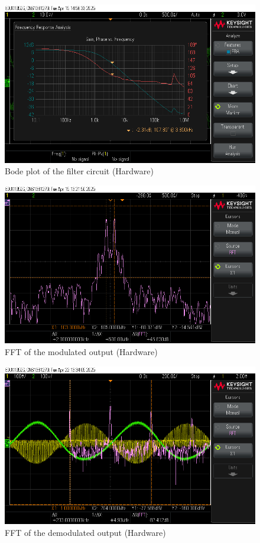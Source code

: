 \documentclass[conference]{IEEEtran}
\begin{document}
\begin{figure}
    \centering
    \includegraphics[width=1\linewidth]{Images/filter_response.png}
    \caption{Bode plot of the filter circuit (Hardware)}
\end{figure}

\begin{figure}
    \centering
    \includegraphics[width=1\linewidth]{Images/modulated_output_fft.png}
    \caption{FFT of the modulated output (Hardware)}
\end{figure}

\begin{figure}
    \centering
    \includegraphics[width=1\linewidth]{Images/demodulated_output_fft.png}
    \caption{FFT of the demodulated output (Hardware)}
\end{figure}
\end{document}
